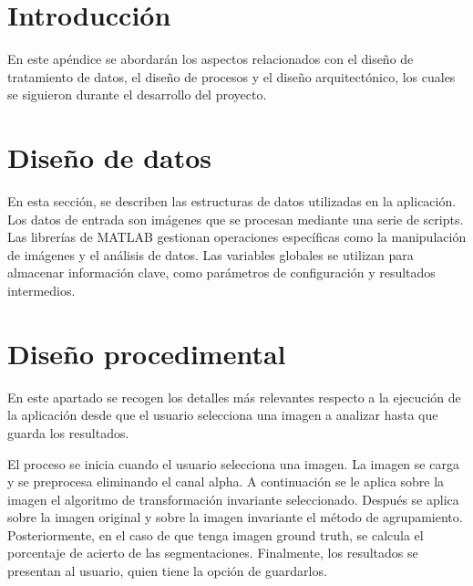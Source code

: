 
\section{Introducción}\label{introducción-diseño}

En este apéndice se abordarán los aspectos relacionados con el diseño de tratamiento de datos, el diseño de procesos y el diseño arquitectónico, los cuales se siguieron durante el desarrollo del proyecto.

\section{Diseño de datos}\label{diseño-de-datos}

En esta sección, se describen las estructuras de datos utilizadas en la aplicación. Los datos de entrada son imágenes que se procesan mediante una serie de scripts. Las librerías de MATLAB gestionan operaciones específicas como la manipulación de imágenes y el análisis de datos. Las variables globales se utilizan para almacenar información clave, como parámetros de configuración y resultados intermedios.

\section{Diseño procedimental}\label{diseño-procedimental}

En este apartado se recogen los detalles más relevantes respecto a la ejecución de la aplicación desde que el usuario selecciona una imagen a analizar hasta que guarda los resultados.


El proceso se inicia cuando el usuario selecciona una imagen. La imagen se carga y se preprocesa eliminando el canal alpha. A continuación se le aplica sobre la imagen el algoritmo de transformación invariante seleccionado. Después se aplica sobre la imagen original y sobre la imagen invariante el método de agrupamiento. Posteriormente, en el caso de que tenga imagen ground truth, se calcula el porcentaje de acierto de las segmentaciones. Finalmente, los resultados se presentan al usuario, quien tiene la opción de guardarlos.


